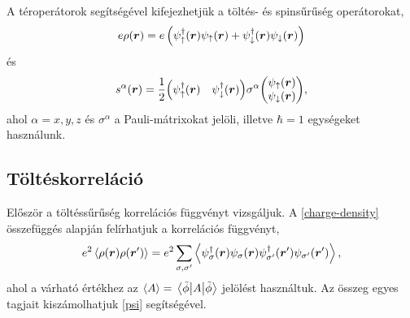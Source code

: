 \documentclass[a4paper,12pt,titlepage]{article}
\newcommand{\RR}{{\vb*{r}}}
\begin{document}
A téroperátorok segítségével kifejezhetjük a töltés- és spinsűrűség operátorokat,
\begin{equation} \label{charge-density}
	e \rho(\RR) = e \left( \psi_\uparrow^\dagger(\RR) \psi_\uparrow(\RR) + \psi_\downarrow^\dagger(\RR) \psi_\downarrow(\RR) \right)
\end{equation}
és
\begin{equation} \label{spin-density}
	s^\alpha(\RR) = \frac{1}{2} \mqty(\psi_\uparrow^\dagger(\RR) & \psi_\downarrow^\dagger(\RR)) \sigma^\alpha \mqty(\psi_\uparrow(\RR) \\ \psi_\downarrow(\RR)),
\end{equation}
ahol $\alpha = x, y, z$ és $\sigma^\alpha$ a Pauli-mátrixokat jelöli, illetve $\hbar = 1$ egységeket használunk.


\subsection{Töltéskorreláció}

Először a töltéssűrűség korrelációs függvényt vizsgáljuk.  A \eqref{charge-density} összefüggés alapján felírhatjuk a korrelációs függvényt,
\begin{equation}
	e^2 \expval{\rho(\RR) \rho(\RR^\prime)} = e^2 \sum\limits_{\sigma, \sigma^\prime} \expval{\psi_\sigma^\dagger(\RR) \psi_\sigma(\RR) \psi_{\sigma^\prime}^\dagger(\RR^\prime) \psi_{\sigma^\prime}(\RR^\prime)},
\end{equation}
ahol a várható értékhez az $\expval{A} = \matrixelement{\tilde{\phi}}{A}{\tilde{\phi}}$ jelölést használtuk.  Az összeg egyes tagjait kiszámolhatjuk \eqref{psi} segítségével.
\end{document}
